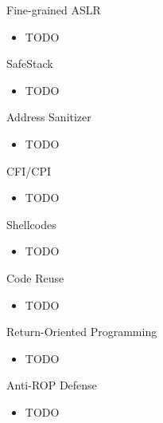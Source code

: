 \documentclass{curs}
\begin{document}
\begin{frame}{Fine-grained ASLR}
  \begin{itemize}
    \item TODO
  \end{itemize}
\end{frame}

\begin{frame}{SafeStack}
  \begin{itemize}
    \item TODO
  \end{itemize}
\end{frame}

\begin{frame}{Address Sanitizer}
  \begin{itemize}
    \item TODO
  \end{itemize}
\end{frame}

\begin{frame}{CFI/CPI}
  \begin{itemize}
    \item TODO
  \end{itemize}
\end{frame}

\begin{frame}{Shellcodes}
  \begin{itemize}
    \item TODO
  \end{itemize}
\end{frame}

\begin{frame}{Code Reuse}
  \begin{itemize}
    \item TODO
  \end{itemize}
\end{frame}

\begin{frame}{Return-Oriented Programming}
  \begin{itemize}
    \item TODO
  \end{itemize}
\end{frame}

\begin{frame}{Anti-ROP Defense}
  \begin{itemize}
    \item TODO
  \end{itemize}
\end{frame}
\end{document}

